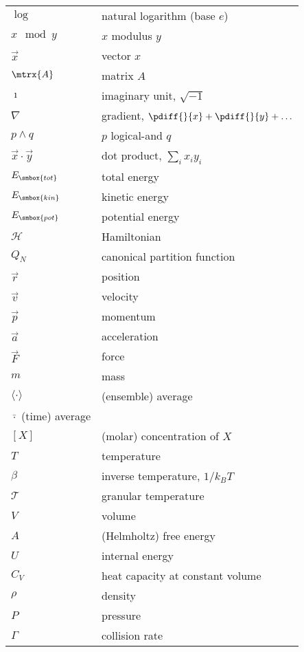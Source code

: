 \begin{center}
\begin{longtable}{|l|l|}
$\log$           & natural logarithm (base $e$)   \\
$x \mod y$       & $x$ modulus $y$                \\
$\vec{x}$        & vector $x$                     \\
$\mtrx{A}$       & matrix $A$                     \\
$\imath$         & imaginary unit, $\sqrt{-1}$    \\
$\nabla$         & gradient, $\pdiff{}{x}+\pdiff{}{y}+\ldots$ \\
$p \wedge q$     & $p$ logical-and $q$            \\
$\vec{x}\cdot\vec{y}$ & dot product, $\sum_i x_iy_i$ \\
$E_{\smbox{tot}}$& total energy                   \\
$E_{\smbox{kin}}$& kinetic energy                 \\
$E_{\smbox{pot}}$& potential energy               \\
$\mathcal{H}$      & Hamiltonian                    \\
$Q_N$            & canonical partition function   \\
$\vec{r}$        & position                       \\
$\vec{v}$        & velocity                       \\
$\vec{p}$        & momentum                       \\
$\vec{a}$        & acceleration                   \\
$\vec{F}$        & force                          \\
$m$              & mass                           \\
$\langle\cdot\rangle$ & (ensemble) average        \\
$\bar{\cdot}$ (time) average                      \\
\hline

$[X]$            & (molar) concentration of $X$  \\
$T$              & temperature                    \\
$\beta$          & inverse temperature, $1/k_B T$ \\
$\mathcal{T}$      & granular temperature           \\
$V$              & volume                         \\
$A$              & (Helmholtz) free energy        \\
$U$              & internal energy                \\
$C_V$            & heat capacity at constant volume \\
$\rho$           & density                        \\
$P$              & pressure                       \\
$\Gamma$         & collision rate                 \\
\hline


\end{longtable}
\end{center}
